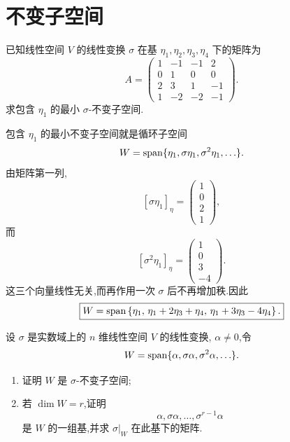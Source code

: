 \newpage

\section{不变子空间}

\begin{example}
已知线性空间 $V$ 的线性变换 $\sigma$ 在基
$\eta_1,\eta_2,\eta_3,\eta_4$ 下的矩阵为
\[
A=
\begin{pmatrix}
1&-1&-1&2\\
0&1&0&0\\
2&3&1&-1\\
1&-2&-2&-1
\end{pmatrix}.
\]
求包含 $\eta_1$ 的最小 $\sigma$-不变子空间.
\end{example}
\exampleblank

\begin{solution}
包含 $\eta_1$ 的最小不变子空间就是循环子空间
\[
W=\operatorname{span}\{\eta_1,\sigma\eta_1,\sigma^2\eta_1,\ldots\}.
\]
由矩阵第一列,
\[
[\sigma\eta_1]_{\eta}
=
\begin{pmatrix}1\\0\\2\\1\end{pmatrix},
\]
而
\[
[\sigma^2\eta_1]_{\eta}
=
\begin{pmatrix}1\\0\\3\\-4\end{pmatrix}.
\]
这三个向量线性无关,而再作用一次 $\sigma$ 后不再增加秩.因此
\[
\boxed{
W=
\operatorname{span}\left\{
\eta_1,\,
\eta_1+2\eta_3+\eta_4,\,
\eta_1+3\eta_3-4\eta_4
\right\}.
}
\]
\end{solution}


\begin{example}[\markstar]
设 $\sigma$ 是实数域上的 $n$ 维线性空间 $V$ 的线性变换,
$\alpha\neq0$,令
\[
W=\operatorname{span}\{\alpha,\sigma\alpha,\sigma^2\alpha,\ldots\}.
\]
\begin{enumerate}
    \item 证明 $W$ 是 $\sigma$-不变子空间;
    \item 若 $\dim W=r$,证明
    \[
    \alpha,\sigma\alpha,\ldots,\sigma^{r-1}\alpha
    \]
    是 $W$ 的一组基,并求 $\sigma|_W$ 在此基下的矩阵.
\end{enumerate}
\end{example}
\exampleblank

